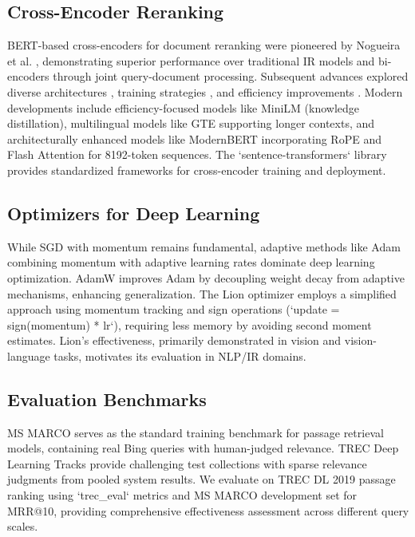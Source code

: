 \documentclass[conference]{IEEEtran}
\begin{document}
\subsection{Cross-Encoder Reranking}
BERT-based cross-encoders for document reranking were pioneered by Nogueira et al. \cite{nogueira2020passagererankingbert, Nogueira2020Document}, demonstrating superior performance over traditional IR models and bi-encoders through joint query-document processing. Subsequent advances explored diverse architectures \cite{Lin2021PretrainedTF}, training strategies \cite{gao2021complementing}, and efficiency improvements \cite{hofstatter2020improving}. Modern developments include efficiency-focused models like MiniLM \cite{wang2020minilm} (knowledge distillation), multilingual models like GTE \cite{li2023towards} supporting longer contexts, and architecturally enhanced models like ModernBERT \cite{modernbert} incorporating RoPE \cite{su2023roformerenhancedtransformerrotary} and Flash Attention \cite{dao2022flashattentionfastmemoryefficientexact} for 8192-token sequences. The `sentence-transformers` library \cite{reimers2019sentence} provides standardized frameworks for cross-encoder training and deployment.

\subsection{Optimizers for Deep Learning}
While SGD with momentum remains fundamental, adaptive methods like Adam \cite{kingma2017adam} combining momentum with adaptive learning rates dominate deep learning optimization. AdamW \cite{loshchilov2019decoupled} improves Adam by decoupling weight decay from adaptive mechanisms, enhancing generalization. The Lion optimizer \cite{chen2023symbolic} employs a simplified approach using momentum tracking and sign operations (`update = sign(momentum) * lr`), requiring less memory by avoiding second moment estimates. Lion's effectiveness, primarily demonstrated in vision and vision-language tasks, motivates its evaluation in NLP/IR domains.

\subsection{Evaluation Benchmarks}
MS MARCO \cite{DBLP:journals/corr/NguyenRSGTMD16} serves as the standard training benchmark for passage retrieval models, containing real Bing queries with human-judged relevance. TREC Deep Learning Tracks \cite{craswell2020overview, craswell2021overview} provide challenging test collections with sparse relevance judgments from pooled system results. We evaluate on TREC DL 2019 passage ranking using `trec\_eval` \cite{trec_eval_github} metrics and MS MARCO development set for MRR@10, providing comprehensive effectiveness assessment across different query scales.
\end{document}
